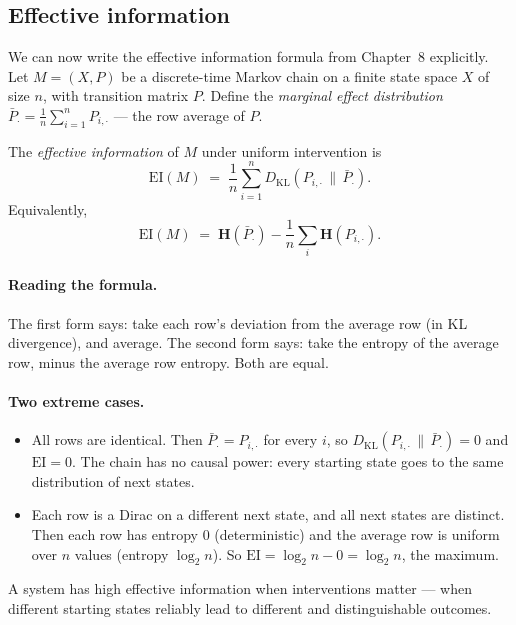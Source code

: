 \subsection*{Effective information}

We can now write the effective information formula from Chapter~8
explicitly. Let $M = (X, P)$ be a discrete-time Markov chain on a
finite state space $X$ of size $n$, with transition matrix $P$.
Define the \emph{marginal effect distribution} $\bar P_\cdot =
\frac{1}{n} \sum_{i=1}^n P_{i, \cdot}$ --- the row average of $P$.

The \emph{effective information} of $M$ under uniform intervention
is
\[
  \mathrm{EI}(M) \;=\; \frac{1}{n} \sum_{i=1}^n D_{\mathrm{KL}}(P_{
  i, \cdot} \,\|\, \bar P_\cdot).
\]
Equivalently,
\[
  \mathrm{EI}(M) \;=\; \mathbf{H}(\bar P_\cdot) - \frac{1}{n}
  \sum_i \mathbf{H}(P_{i, \cdot}).
\]

\paragraph{Reading the formula.} The first form says: take each
row's deviation from the average row (in KL divergence), and
average. The second form says: take the entropy of the average row,
minus the average row entropy. Both are equal.

\paragraph{Two extreme cases.}

\begin{itemize}[leftmargin=1.5em,itemsep=2pt]
  \item All rows are identical. Then $\bar P_\cdot = P_{i, \cdot}$
    for every $i$, so $D_{\mathrm{KL}}(P_{i, \cdot} \,\|\, \bar
    P_\cdot) = 0$ and $\mathrm{EI} = 0$. The chain has no causal
    power: every starting state goes to the same distribution of
    next states.
  \item Each row is a Dirac on a different next state, and all next
    states are distinct. Then each row has entropy $0$ (deterministic)
    and the average row is uniform over $n$ values (entropy $\log_2
    n$). So $\mathrm{EI} = \log_2 n - 0 = \log_2 n$, the maximum.
\end{itemize}

A system has high effective information when interventions matter
--- when different starting states reliably lead to different and
distinguishable outcomes.

